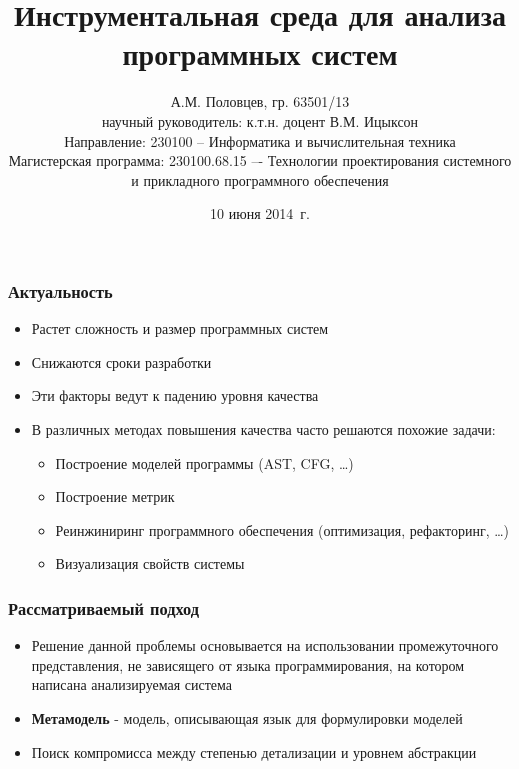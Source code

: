 \documentclass[handout]{beamer}
\title[Инструментальная среда]{Инструментальная среда для анализа программных систем}
\author[А.М. Половцев]{
    А.М. Половцев, гр. 63501/13\\
    научный руководитель: к.т.н. доцент В.М. Ицыксон\\[3ex]
    Направление: 230100 -- Информатика и вычислительная техника\\
    Магистерская программа: 230100.68.15 –- Технологии проектирования
системного и прикладного программного обеспечения
}
\institute[СПбГПУ]{Санкт-Петербургский государственный политехнический университет}
\date[10 июня 2014~г.]{10 июня 2014~г.}
\begin{document}
\frame{\titlepage}
\begin{frame}
\frametitle{Актуальность}

\begin{itemize}
    \item Растет сложность и размер программных систем
    \item Снижаются сроки разработки
    \item Эти факторы ведут к падению уровня качества
    \item В различных методах повышения качества часто решаются похожие задачи:
    \begin{itemize}
        \item Построение моделей программы (AST, CFG, \ldots)
        \item Построение метрик
        \item Реинжиниринг программного обеспечения (оптимизация, рефакторинг, \ldots)
        \item Визуализация свойств системы
    \end{itemize}
\end{itemize}

\begin{alertblock}{}
\end{alertblock}

\end{frame}
\begin{frame}
\frametitle{Рассматриваемый подход}

\begin{itemize}
    \item Решение данной проблемы основывается на использовании промежуточного
    представления, не зависящего от языка программирования, на котором написана
    анализируемая система
    \item \textbf{Метамодель} - модель, описывающая язык для формулировки моделей
    \item Поиск компромисса между степенью детализации и уровнем абстракции
\end{itemize}

\end{frame}
\end{document}
